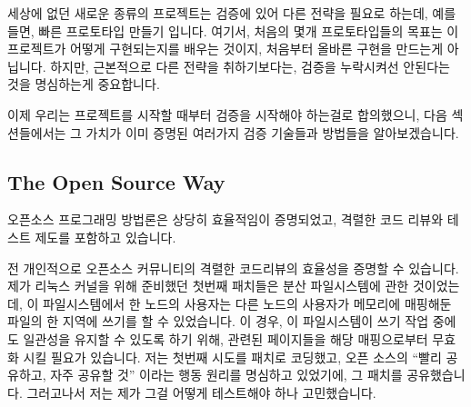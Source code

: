 세상에 없던 새로운 종류의 프로젝트는 검증에 있어 다른 전략을 필요로 하는데,
예를 들면, 빠른 프로토타입 만들기 입니다.
여기서, 처음의 몇개 프로토타입들의 목표는 이 프로젝트가 어떻게 구현되는지를
배우는 것이지, 처음부터 올바른 구현을 만드는게 아닙니다.
하지만, 근본적으로 다른 전략을 취하기보다는, 검증을 누락시켜선 안된다는 것을
명심하는게 중요합니다.

이제 우리는 프로젝트를 시작할 때부터 검증을 시작해야 하는걸로 합의했으니, 다음
섹션들에서는 그 가치가 이미 증명된 여러가지 검증 기술들과 방법들을
알아보겠습니다.

\subsection{The Open Source Way}
\label{sec:debugging:The Open Source Way}

오픈소스 프로그래밍 방법론은 상당히 효율적임이 증명되었고, 격렬한 코드 리뷰와
테스트 제도를 포함하고 있습니다.

전 개인적으로 오픈소스 커뮤니티의 격렬한 코드리뷰의 효율성을 증명할 수
있습니다.
제가 리눅스 커널을 위해 준비했던 첫번째 패치들은 분산 파일시스템에 관한
것이었는데, 이 파일시스템에서 한 노드의 사용자는 다른 노드의 사용자가 메모리에
매핑해둔 파일의 한 지역에 쓰기를 할 수 있었습니다.
이 경우, 이 파일시스템이 쓰기 작업 중에도 일관성을 유지할 수 있도록 하기 위해,
관련된 페이지들을 해당 매핑으로부터 무효화 시킬 필요가 있습니다.
저는 첫번째 시도를 패치로 코딩했고, 오픈 소스의 ``빨리 공유하고, 자주 공유할
것'' 이라는 행동 원리를 명심하고 있었기에, 그 패치를 공유했습니다.
그러고나서 저는 제가 그걸 어떻게 테스트해야 하나 고민했습니다.

